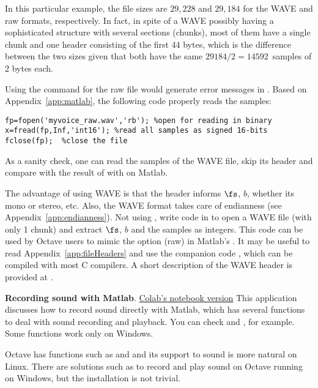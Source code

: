 In this particular example, the file sizes are $29,228$ and $29,184$ for the WAVE and raw formats, respectively. In fact, in spite of a WAVE possibly having a sophisticated structure with several sections (chunks), most of them have a single chunk and one header consisting of the first 44 bytes, which is the difference between the two sizes given that both have the same $29184/2=14592$~samples of 2 bytes each.

Using the command  for the raw file would generate error messages in {\matlab}. Based on Appendix~\ref{app:matlab}, the following code properly reads the samples:
\begin{lstlisting}
fp=fopen('myvoice_raw.wav','rb'); %open for reading in binary
x=fread(fp,Inf,'int16'); %read all samples as signed 16-bits
fclose(fp);  %close the file
\end{lstlisting}
As a sanity check, one can read the samples of the WAVE file, skip its header and compare with the result of  with  on Matlab.

The advantage of using WAVE is that the header informs $\fs$, $b$, whether its mono or stereo, etc. Also, the WAVE format takes care of endianness (see Appendix~\ref{app:endianness}).
Not using , write code in {\matlab} to open a WAVE file (with only 1 chunk) and extract $\fs$, $b$ and the samples as integers. This code can be used by Octave users to mimic the option  (raw) in Matlab's . 
\ifdefined\akAmazonBook
\else
It may be useful to read Appendix~\ref{app:fileHeaders} and use the companion code , which can be compiled with most C compilers. A short description of the WAVE header is provided at .
\fi
\eApplication 

\bApplication \textbf{Recording sound with Matlab}. \href{https://colab.research.google.com/github/aldebaro/dsp-telecom-book-code/blob/master/PythonNotebooks/ch1ap2_RecordingSound.ipynb?authuser=2}{Colab's notebook version}
This application discusses how to record sound directly with Matlab, which has several functions to deal with sound recording and playback. You can check  and , for example. Some functions work only on Windows.

Octave has functions such as  and  and its support to sound is more natural on Linux. There are solutions such as  to record and play sound on Octave running on Windows, but the installation is not trivial.

